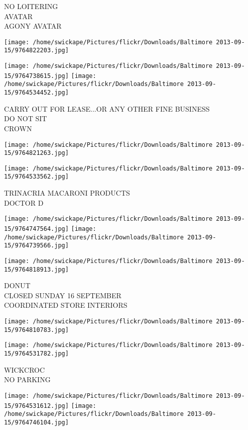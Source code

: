 \documentclass[10pt,letterpaper]{article}
\begin{document}
NO LOITERING\\
AVATAR\\
AGONY AVATAR
\pagebreak

\texttt{[image: /home/swickape/Pictures/flickr/Downloads/Baltimore 2013-09-15/9764822203.jpg]}

\vspace{0.25in}
\texttt{[image: /home/swickape/Pictures/flickr/Downloads/Baltimore 2013-09-15/9764738615.jpg]}
\texttt{[image: /home/swickape/Pictures/flickr/Downloads/Baltimore 2013-09-15/9764534452.jpg]}

CARRY OUT FOR LEASE...OR ANY OTHER FINE BUSINESS\\
DO NOT SIT\\
CROWN
\pagebreak

\texttt{[image: /home/swickape/Pictures/flickr/Downloads/Baltimore 2013-09-15/9764821263.jpg]}

\vspace{0.25in}
\texttt{[image: /home/swickape/Pictures/flickr/Downloads/Baltimore 2013-09-15/9764533562.jpg]}

TRINACRIA MACARONI PRODUCTS\\
DOCTOR D
\pagebreak

\texttt{[image: /home/swickape/Pictures/flickr/Downloads/Baltimore 2013-09-15/9764747564.jpg]}
\texttt{[image: /home/swickape/Pictures/flickr/Downloads/Baltimore 2013-09-15/9764739566.jpg]}

\vspace{0.25in}
\texttt{[image: /home/swickape/Pictures/flickr/Downloads/Baltimore 2013-09-15/9764818913.jpg]}

DONUT\\
CLOSED SUNDAY 16 SEPTEMBER\\
COORDINATED STORE INTERIORS
\pagebreak

\texttt{[image: /home/swickape/Pictures/flickr/Downloads/Baltimore 2013-09-15/9764810783.jpg]}

\vspace{0.25in}
\texttt{[image: /home/swickape/Pictures/flickr/Downloads/Baltimore 2013-09-15/9764531782.jpg]}

WICKCROC\\
NO PARKING
\pagebreak

\texttt{[image: /home/swickape/Pictures/flickr/Downloads/Baltimore 2013-09-15/9764531612.jpg]}
\texttt{[image: /home/swickape/Pictures/flickr/Downloads/Baltimore 2013-09-15/9764746104.jpg]}
\end{document}
